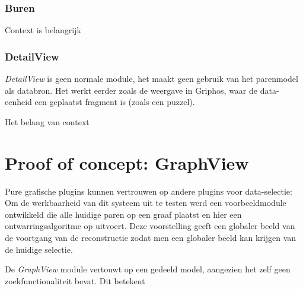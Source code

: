 \subsubsection{Buren}

Context is belangrijk

\subsubsection{DetailView}
\emph{DetailView} is geen normale module, het maakt geen gebruik van het parenmodel als databron. Het werkt eerder zoals de weergave in Griphos, waar de data-eenheid een geplaatst fragment is (zoals een puzzel).

Het belang van context

\section{Proof of concept: GraphView}
Pure grafische plugins kunnen vertrouwen op andere plugins voor data-selectie: Om de werkbaarheid van dit systeem uit te testen werd een voorbeeldmodule ontwikkeld die alle huidige paren op een graaf plaatst en hier een ontwarringsalgoritme op uitvoert. Deze voorstelling geeft een globaler beeld van de voortgang van de reconstructie zodat men een globaler beeld kan krijgen van de huidige selectie.

De \emph{GraphView} module vertouwt op een gedeeld model, aangezien het zelf geen zoekfunctionaliteit bevat. Dit betekent 
